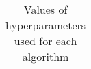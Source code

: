 \begin{table}[ht]
\begin{tabular}{lrl}
\hline
\end{tabular}
\caption{Values of hyperparameters used for each algorithm} \label{tab:hyperparams}
\end{table}
